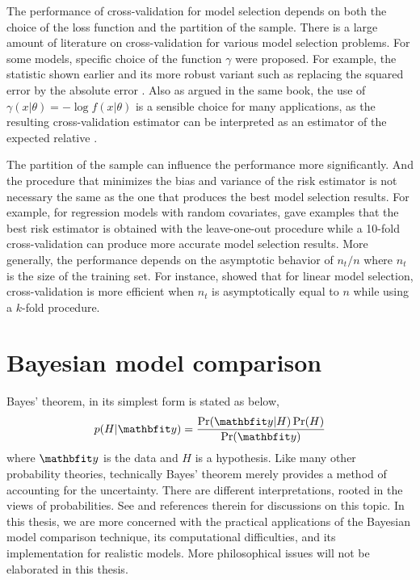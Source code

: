 The performance of cross-validation for model selection depends on both the
choice of the loss function and the partition of the sample. There is a large
amount of literature on cross-validation for various model selection
problems. For some models, specific choice of the function $\gamma$ were
proposed. For example, the \press statistic shown earlier and its more robust
variant such as replacing the squared error by the absolute error
\cite[][sec.~2.9]{Claeskens:2008tq}. Also as argued in the same book, the use
of $\gamma(x|\theta) = -\log f(x|\theta)$ is a sensible choice for many
applications, as the resulting cross-validation estimator can be interpreted
as an estimator of the expected relative \kld.

The partition of the sample can influence the performance more significantly.
And the procedure that minimizes the bias and variance of the risk estimator
is not necessary the same as the one that produces the best model selection
results. For example, for regression models with random covariates,
\cite{Breiman:1992vx} gave examples that the best risk estimator is obtained
with the leave-one-out procedure while a 10-fold cross-validation can produce
more accurate model selection results. More generally, the performance
depends on the asymptotic behavior of $n_t/n$ where $n_t$ is the size of the
training set. For instance, \cite{Shao:1997vx} showed that for linear model
selection, cross-validation is more efficient when $n_t$ is asymptotically
equal to $n$ while using a $k$-fold procedure.

\section{Bayesian model comparison}
\label{sec:Bayesian model comparison}

Bayes' theorem, in its simplest form is stated as below,
\begin{equation}
  p(H|\data) = \frac{\Pr(\data|H)\Pr(H)}{\Pr(\data)} \label{eq:bayes}
\end{equation}
where $\data$ is the data and $H$ is a hypothesis. Like many other
probability theories, technically Bayes' theorem merely provides a method of
accounting for the uncertainty. There are different interpretations, rooted
in the views of probabilities. See \cite[][chap.~1]{Bernardo:1994vd} and
references therein for discussions on this topic. In this thesis, we are more
concerned with the practical applications of the Bayesian model comparison
technique, its computational difficulties, and its implementation for
realistic models. More philosophical issues will not be elaborated in this
thesis.

